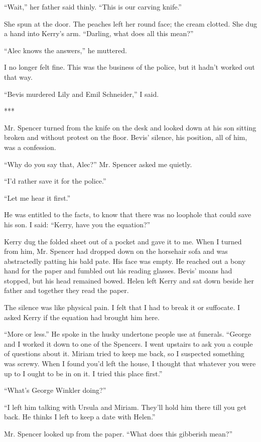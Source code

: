 {“Wait,” her father said thinly. “This is our carving knife.”

She spun at the door. The peaches left her round face; the cream clotted. She dug a hand into Kerry’s arm. “Darling, what does all this mean?”

“Alec knows the answers,” he muttered.

I no longer felt fine. This was the business of the police, but it hadn’t worked out that way.

“Bevis murdered Lily and Emil Schneider,” I said.

***

Mr. Spencer turned from the knife on the desk and looked down at his son sitting broken and without protest on the floor. Bevis’ silence, his position, all of him, was a confession.

“Why do you say that, Alec?” Mr. Spencer asked me quietly.

“I’d rather save it for the police.”

“Let me hear it first.”

He was entitled to the facts, to know that there was no loophole that could save his son. I said: “Kerry, have you the equation?”

Kerry dug the folded sheet out of a pocket and gave it to me. When I turned from him, Mr. Spencer had dropped down on the horsehair sofa and was abstractedly patting his bald pate. His face was empty. He reached out a bony hand for the paper and fumbled out his reading glasses. Bevis’ moans had stopped, but his head remained bowed. Helen left Kerry and sat down beside her father and together they read the paper.

The silence was like physical pain. I felt that I had to break it or suffocate. I asked Kerry if the equation had brought him here.

“More or less.” He spoke in the husky undertone people use at funerals. “George and I worked it down to one of the Spencers. I went upstairs to ask you a couple of questions about it. Miriam tried to keep me back, so I suspected something was screwy. When I found you’d left the house, I thought that whatever you were up to I ought to be in on it. I tried this place first.”

“What’s George Winkler doing?”

“I left him talking with Ursula and Miriam. They’ll hold him there till you get back. He thinks I left to keep a date with Helen.”

Mr. Spencer looked up from the paper. “What does this gibberish mean?”

}
